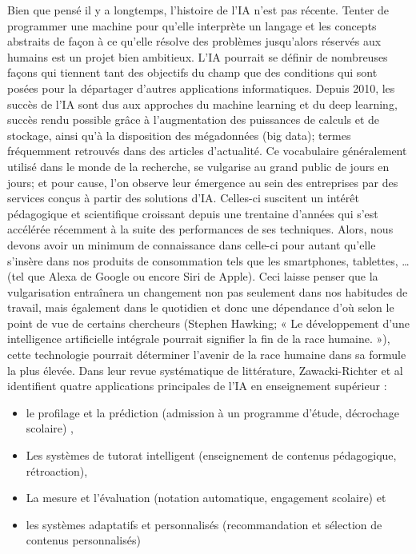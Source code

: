 Bien que pensé il y a longtemps, l’histoire de l’IA n’est pas récente. Tenter de programmer une machine pour qu’elle interprète un langage et les concepts abstraits de façon à ce qu’elle résolve des problèmes jusqu’alors réservés aux humains est un projet bien ambitieux. L’IA pourrait se définir de nombreuses façons  qui tiennent tant des objectifs du champ que des conditions qui sont posées pour la départager d’autres applications informatiques. Depuis 2010, les succès de l’IA sont dus aux approches du machine learning et du deep learning, succès rendu possible grâce à l’augmentation des puissances de calculs et de stockage, ainsi qu’à la disposition des mégadonnées (big data); termes fréquemment  retrouvés dans des articles d’actualité. Ce vocabulaire généralement utilisé dans le monde de la recherche, se vulgarise au grand public de jours en jours; et pour cause, l’on observe leur émergence au sein des entreprises par des services conçus à partir des solutions d’IA. Celles-ci suscitent un intérêt pédagogique et scientifique croissant depuis une trentaine d’années qui s’est accélérée récemment à la suite des performances de ses techniques. Alors, nous devons avoir un minimum de connaissance dans celle-ci pour autant qu’elle s’insère dans nos produits de consommation tels que les smartphones, tablettes, … (tel que Alexa de Google ou encore Siri de Apple). Ceci laisse penser que la vulgarisation entraînera un changement non pas seulement dans nos habitudes de travail, mais également dans le quotidien et donc une dépendance d’où selon le point de vue de certains chercheurs (Stephen Hawking; « Le développement d'une intelligence artificielle intégrale pourrait signifier la fin de la race humaine. »), cette technologie pourrait déterminer l’avenir de la race humaine dans sa formule la plus élevée. Dans leur revue systématique de littérature, Zawacki-Richter et al identifient quatre applications principales de l’IA en enseignement supérieur : 

\begin{itemize}
	\item le profilage et la prédiction (admission à un programme d’étude, décrochage scolaire) ,
	\item Les systèmes de tutorat intelligent (enseignement de contenus pédagogique, rétroaction), 
	\item La mesure et l’évaluation (notation automatique, engagement scolaire) et 
	\item les systèmes adaptatifs et personnalisés (recommandation et sélection de contenus personnalisés)
\end{itemize}

